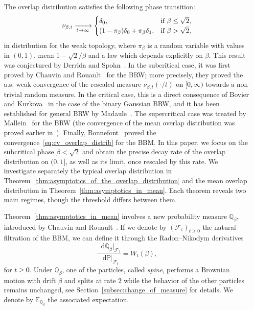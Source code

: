 \documentclass[10pt]{amsart}
\theoremstyle{definition}\newtheorem{defi}[theo]{Definition}\newtheorem{rema}[theo]{Remark}\newtheorem{exam}[theo]{Example}\newtheorem{exem}[theo]{Example}\newtheorem{nota}[theo]{Notation}
\renewcommand{\d}[1]{\mathop{}\!\mathrm{d}#1}
\newcommand{\E}{\mathbb{E}}
\renewcommand{\P}{\mathbb{P}}
\newcommand{\Q}{\mathbb{Q}}
\newcommand\1{\mathds{1}}
\newcommand{\cF}{\mathcal{F}}
\renewcommand*{\to}{\mathchoice{\longrightarrow}{\rightarrow}{\rightarrow}{\rightarrow}}
\begin{document}
The overlap distribution satisfies the following phase transition:
\begin{equation}\label{eq:cv_overlap_distrib}
\nu_{\beta, t}
\xrightarrow[t\to\infty]{}
\begin{cases}
\delta_0, &\text{if } \beta \leq \sqrt{2}, \\
(1 - \pi_\beta) \delta_0 + \pi_\beta \delta_1, &\text{if } \beta > \sqrt{2},
\end{cases}
\end{equation}
in distribution for the weak topology, where $\pi_\beta$ is a random variable with values in $(0,1)$, mean $1-\sqrt{2}/\beta$ and a law which depends explicitly on $\beta$. This result was conjectured by Derrida and Spohn~\cite{DerridaSpohn1988}. In the subcritical case, it was first proved by Chauvin and Rouault~\cite{ChauvinRouault1997} for the BRW; more precisely, they proved the a.s. weak convergence of the rescaled measure $\nu_{\beta,t}(\cdot/t)$ on $[0,\infty)$ towards a non-trivial random measure. In the critical case, this is a direct consequence of Bovier and Kurkova~\cite{BovierKurkova2004} in the case of the binary Gaussian BRW, and it has been established for general BRW by Madaule~\cite{Madaule2016}. The supercritical case was treated by Mallein~\cite{Mallein2018} for the BRW (the convergence of the mean overlap distribution was proved earlier in~\cite{BovierKurkova2004}). Finally, Bonnefont~\cite{Bonnefont2022} proved the convergence~\eqref{eq:cv_overlap_distrib} for the BBM. In this paper, we focus on the subcritical phase $\beta < \sqrt{2}$ and obtain the precise decay rate of the overlap distribution on $(0,1]$, as well as its limit, once rescaled by this rate. We investigate separately the typical overlap distribution in Theorem~\ref{thm:asymptotics_of_the_overlap_distribution} and the mean overlap distribution in Theorem~\ref{thm:asymptotics_in_mean}. Each theorem reveals two main regimes, though the threshold differs between them.



Theorem~\ref{thm:asymptotics_in_mean} involves a new probability measure $\Q_{\beta}$, introduced by Chauvin and Rouault~\cite{ChauvinRouault1988}. If we denote by $(\cF_t)_{t \geq 0}$ the natural filtration of the BBM, we can define it through the Radon--Nikodym derivatives
\begin{equation}\label{eq:definition_of_Q_b_without_spine}
\frac{\d{\Q_{\beta}|_{\cF_t}}}{\d{\P|_{\cF_t}}} = W_t(\beta),
\end{equation}
for $t \geq 0$. Under $\Q_{\beta}$, one of the particles, called \emph{spine}, performs a Brownian motion with drift $\beta$ and splits at rate $2$ while the behavior of the other particles remains unchanged, see Section~\ref{subsec:change_of_measure} for details. We denote by $\E_{\Q_\beta}$ the associated expectation.
\end{document}
